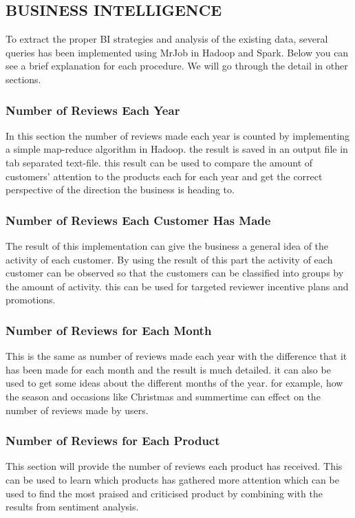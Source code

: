 \subsection{BUSINESS INTELLIGENCE}
To extract the proper BI strategies and analysis of the existing data, several queries has been implemented using MrJob in Hadoop and Spark. Below you can see a brief explanation for each procedure. We will go through the detail in other sections.

\subsubsection{Number of Reviews Each Year}

In this section the number of reviews made each year is counted by implementing a simple map-reduce algorithm in Hadoop. the result is saved in an output file in tab separated text-file. this result can be used to compare the amount of customers' attention to the products each for each year and get the correct perspective of the direction  the business is heading to.

\subsubsection{Number of Reviews Each Customer Has Made}

The result of this implementation can give the business a general idea of the activity of each customer. By using the result of this part the activity of each customer can be observed so that the customers can be classified into groups by the amount of activity. this can be used for targeted reviewer incentive plans and promotions.

\subsubsection{Number of Reviews for Each Month}

This is the same as number of reviews made each year with the difference that it has been made for each month and the result is much detailed. it can also be used to get some ideas about the different months of the year. for example, how the season and occasions like Christmas and summertime can effect on the number of reviews made by users.
\subsubsection{Number of Reviews for Each Product}
This section will provide the number of reviews each product has received. This can be used to learn which products has gathered more attention which can be used to find the most praised and criticised product by combining with the results from sentiment analysis. 
